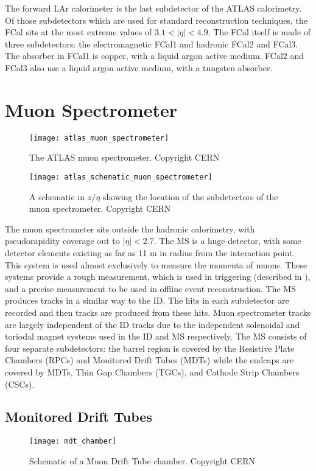 The forward LAr calorimeter is the last subdetector of the ATLAS calorimetry.
Of those subdetectors which are used for standard reconstruction techniques, the FCal sits at the most extreme values of $ 3.1 < |\eta| < 4.9$.
The FCal itself is made of three subdetectors: the electromagnetic FCal1 and hadronic FCal2 and FCal3.
The absorber in FCal1 is copper, with a liquid argon active medium.
FCal2 and FCal3 also use a liquid argon active medium, with a tungsten absorber.

\section{Muon Spectrometer}
\begin{figure}[tbp]
\caption{The ATLAS muon spectrometer. Copyright CERN} \label{fig:atlas_muon_spectrometer}
\texttt{[image: atlas\_muon\_spectrometer]}
\end{figure}

\begin{figure}[tbp]
\caption{A schematic in $z/\eta$ showing the location of the subdetectors of the muon spectrometer. Copyright CERN} \label{fig:atlas_schematic_muon_spectrometer}
\texttt{[image: atlas\_schematic\_muon\_spectrometer]}
\end{figure}

The muon spectrometer sits outside the hadronic calorimetry, with pseudorapidity coverage out to $|\eta| < 2.7$.
The MS is a huge detector, with some detector elements existing as far as 11 m in radius from the interaction point.
This system is used almost exclusively to measure the momenta of muons.
These systems provide a rough measurement, which is used in triggering (described in ), and a precise measurement to be used in offline event reconstruction.
The MS produces tracks in a similar way to the ID.
The hits in each subdetector are recorded and then tracks are produced from these hits.
Muon spectrometer tracks are largely independent of the ID tracks due to the independent solenoidal and toriodal magnet systems used in the ID and MS respectively.
The MS consists of four separate subdetectors: the barrel region is covered by the Resistive Plate Chambers (RPCs) and Monitored Drift Tubes (MDTs) while the endcaps are covered by MDTs, Thin Gap Chambers (TGCs), and Cathode Strip Chambers (CSCs).

\subsection{Monitored Drift Tubes}
\begin{figure}[tbp]
\caption{Schematic of a Muon Drift Tube chamber. Copyright CERN} \label{fig:mdt_chamber}
\texttt{[image: mdt\_chamber]}
\end{figure}

